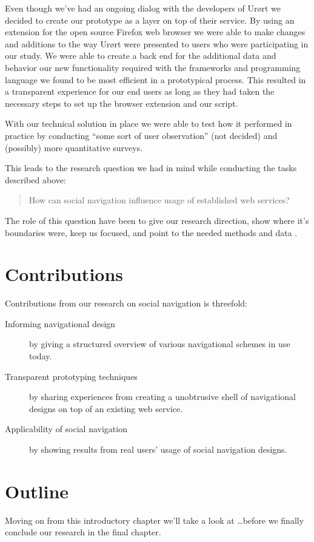 Even though we've had an ongoing dialog with the developers of Ur\o{}rt we
decided to create our prototype as a layer on top of their service. By using an
extension%
\sidefill%
 for the open source Firefox%
web browser we were able to make changes and additions to the way Ur\o{}rt were
presented to users who were participating in our study. We were able to create
a back end for the additional data and behavior our new functionality required
with the frameworks and programming language we found to be most efficient in
a prototypical process. This resulted in a transparent experience for our end
users as long as they had taken the necessary steps to set up the browser
extension and our script.

With our technical solution in place we were able to test how it performed in
practice by conducting ``some sort of user observation'' (not decided) and
(possibly) more quantitative surveys.

This leads to the research question we had in mind while conducting
the tasks described above:

\begin{quote}
  How can social navigation influence usage of established web services?
\end{quote}

The role of this question have been to give our research direction, show where
it's boundaries were, keep us focused, and point to the needed methods and
data \citep[p.~77]{silverman05}.


\section{Contributions}

Contributions from our research on social navigation is threefold:

\begin{description}
  \item[Informing navigational design] by giving a structured overview of
    various navigational schemes in use today.
  \item[Transparent prototyping techniques] by sharing experiences from
    creating a unobtrusive shell of navigational designs on top of an
    existing web service.
  \item[Applicability of social navigation] by showing results from real
    users' usage of social navigation designs.
\end{description}

\section{Outline}

Moving on from this introductory chapter we'll take a look at \ldots before we
finally conclude our research in the final chapter.
